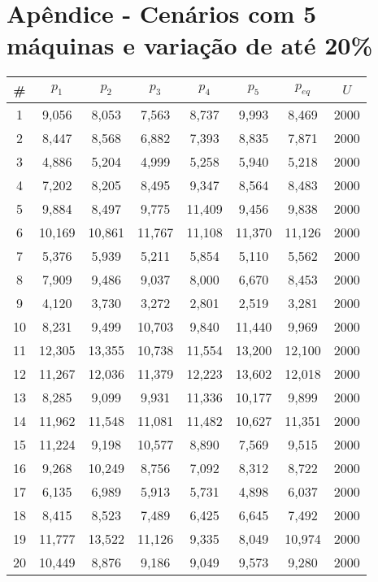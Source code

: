 \section{Apêndice - Cenários com 5 máquinas e variação de até 20\%}\label{app:tab05machine20}

\begin{longtable}{cccccccc}
\hline
\#  & $p_1$  & $p_2$  & $p_3$  & $p_4$  & $p_5$  & $p_{eq}$  & $U$    \\ \hline
1   & 9,056  & 8,053  & 7,563  & 8,737  & 9,993  & 8,469     & 2000 \\
2   & 8,447  & 8,568  & 6,882  & 7,393  & 8,835  & 7,871     & 2000 \\
3   & 4,886  & 5,204  & 4,999  & 5,258  & 5,940  & 5,218     & 2000 \\
4   & 7,202  & 8,205  & 8,495  & 9,347  & 8,564  & 8,483     & 2000 \\
5   & 9,884  & 8,497  & 9,775  & 11,409 & 9,456  & 9,838     & 2000 \\
6   & 10,169 & 10,861 & 11,767 & 11,108 & 11,370 & 11,126    & 2000 \\
7   & 5,376  & 5,939  & 5,211  & 5,854  & 5,110  & 5,562     & 2000 \\
8   & 7,909  & 9,486  & 9,037  & 8,000  & 6,670  & 8,453     & 2000 \\
9   & 4,120  & 3,730  & 3,272  & 2,801  & 2,519  & 3,281     & 2000 \\
10  & 8,231  & 9,499  & 10,703 & 9,840  & 11,440 & 9,969     & 2000 \\
11  & 12,305 & 13,355 & 10,738 & 11,554 & 13,200 & 12,100    & 2000 \\
12  & 11,267 & 12,036 & 11,379 & 12,223 & 13,602 & 12,018    & 2000 \\
13  & 8,285  & 9,099  & 9,931  & 11,336 & 10,177 & 9,899     & 2000 \\
14  & 11,962 & 11,548 & 11,081 & 11,482 & 10,627 & 11,351    & 2000 \\
15  & 11,224 & 9,198  & 10,577 & 8,890  & 7,569  & 9,515     & 2000 \\
16  & 9,268  & 10,249 & 8,756  & 7,092  & 8,312  & 8,722     & 2000 \\
17  & 6,135  & 6,989  & 5,913  & 5,731  & 4,898  & 6,037     & 2000 \\
18  & 8,415  & 8,523  & 7,489  & 6,425  & 6,645  & 7,492     & 2000 \\
19  & 11,777 & 13,522 & 11,126 & 9,335  & 8,049  & 10,974    & 2000 \\
20  & 10,449 & 8,876  & 9,186  & 9,049  & 9,573  & 9,280     & 2000 \\

\end{longtable}
